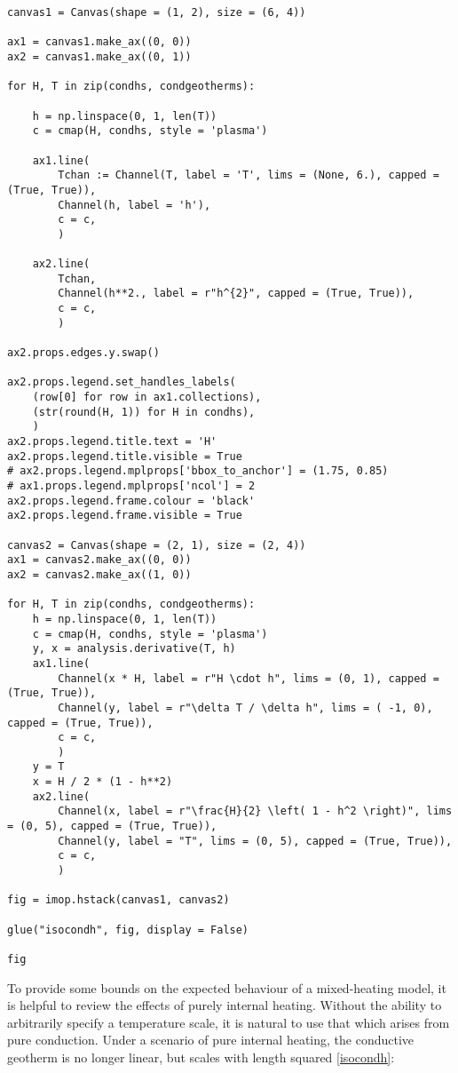 \begin{verbatim}
canvas1 = Canvas(shape = (1, 2), size = (6, 4))

ax1 = canvas1.make_ax((0, 0))
ax2 = canvas1.make_ax((0, 1))

for H, T in zip(condhs, condgeotherms):

    h = np.linspace(0, 1, len(T))
    c = cmap(H, condhs, style = 'plasma')

    ax1.line(
        Tchan := Channel(T, label = 'T', lims = (None, 6.), capped = (True, True)),
        Channel(h, label = 'h'),
        c = c,
        )

    ax2.line(
        Tchan,
        Channel(h**2., label = r"h^{2}", capped = (True, True)),
        c = c,
        )

ax2.props.edges.y.swap()

ax2.props.legend.set_handles_labels(
    (row[0] for row in ax1.collections),
    (str(round(H, 1)) for H in condhs),
    )
ax2.props.legend.title.text = 'H'
ax2.props.legend.title.visible = True
# ax2.props.legend.mplprops['bbox_to_anchor'] = (1.75, 0.85)
# ax1.props.legend.mplprops['ncol'] = 2
ax2.props.legend.frame.colour = 'black'
ax2.props.legend.frame.visible = True

canvas2 = Canvas(shape = (2, 1), size = (2, 4))
ax1 = canvas2.make_ax((0, 0))
ax2 = canvas2.make_ax((1, 0))

for H, T in zip(condhs, condgeotherms):
    h = np.linspace(0, 1, len(T))
    c = cmap(H, condhs, style = 'plasma')
    y, x = analysis.derivative(T, h)
    ax1.line(
        Channel(x * H, label = r"H \cdot h", lims = (0, 1), capped = (True, True)),
        Channel(y, label = r"\delta T / \delta h", lims = ( -1, 0), capped = (True, True)),
        c = c,
        )
    y = T
    x = H / 2 * (1 - h**2)
    ax2.line(
        Channel(x, label = r"\frac{H}{2} \left( 1 - h^2 \right)", lims = (0, 5), capped = (True, True)),
        Channel(y, label = "T", lims = (0, 5), capped = (True, True)),
        c = c,
        )

fig = imop.hstack(canvas1, canvas2)

glue("isocondh", fig, display = False)

fig
\end{verbatim}

To provide some bounds on the expected behaviour of a mixed-heating model, it is helpful to review the effects of purely internal heating. Without the ability to arbitrarily specify a temperature scale, it is natural to use that which arises from pure conduction. Under a scenario of pure internal heating, the conductive geotherm is no longer linear, but scales with length squared \cite{Turcotte2014-by} \ref{isocondh}:

